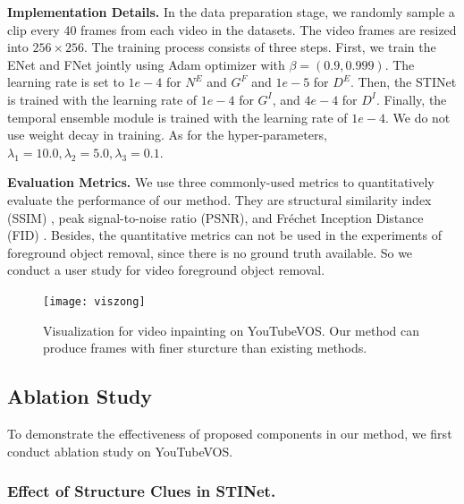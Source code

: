 \noindent \textbf{Implementation Details.} 
In the data preparation stage, we randomly sample a clip every 40 frames from each video in the datasets.
The video frames are resized into $256\times256$.
%
The training process consists of three steps.
First, we  train the ENet and FNet jointly using Adam optimizer with $\beta=(0.9, 0.999)$.
The learning rate is set to $1e-4$ for $N^E$ and $G^F$ and $1e-5$ for $D^E$. Then, the STINet is trained with the learning rate of $1e-4$ for $G^I$, and $4e-4$ for $D^I$. Finally, the temporal ensemble module is trained with the learning rate of $1e-4$.  We do not use weight decay in training.
As for the hyper-parameters, $\lambda_1=10.0,\lambda_2=5.0, \lambda_3=0.1$.

\noindent \textbf{Evaluation Metrics.} 
We use three commonly-used metrics to quantitatively evaluate the performance of our method. They are structural similarity index (SSIM) \cite{wang2004image}, peak signal-to-noise ratio (PSNR), and Fr{\'e}chet Inception Distance (FID) \cite{heusel2017gans}. 
Besides, the quantitative metrics can not be used in the experiments of foreground object removal, since there is no ground truth available. So we conduct a user study for video foreground object removal. 
%



\begin{figure}[t]
	\centering
	\texttt{[image: viszong]} %
	\caption{Visualization for video inpainting on YouTubeVOS. Our method can produce frames with finer sturcture than existing methods. }
	\label{viszong}
\end{figure}




\subsection{Ablation Study}
To demonstrate the effectiveness of proposed components in our method, we first conduct ablation study on YouTubeVOS. 

\subsubsection{Effect of Structure Clues in STINet.}



